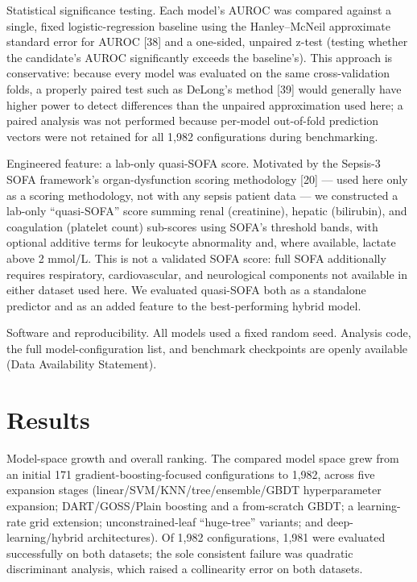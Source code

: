 \documentclass[10pt]{article} %
\begin{document}
Statistical significance testing. Each model's AUROC was compared against a single, fixed logistic-regression baseline using the Hanley--McNeil approximate standard error for AUROC [38] and a one-sided, unpaired z-test (testing whether the candidate's AUROC significantly exceeds the baseline's). This approach is conservative: because every model was evaluated on the same cross-validation folds, a properly paired test such as DeLong's method [39] would generally have higher power to detect differences than the unpaired approximation used here; a paired analysis was not performed because per-model out-of-fold prediction vectors were not retained for all 1,982 configurations during benchmarking.

Engineered feature: a lab-only quasi-SOFA score. Motivated by the Sepsis-3 SOFA framework's organ-dysfunction scoring methodology [20] --- used here only as a scoring methodology, not with any sepsis patient data --- we constructed a lab-only ``quasi-SOFA'' score summing renal (creatinine), hepatic (bilirubin), and coagulation (platelet count) sub-scores using SOFA's threshold bands, with optional additive terms for leukocyte abnormality and, where available, lactate above 2 mmol/L. This is not a validated SOFA score: full SOFA additionally requires respiratory, cardiovascular, and neurological components not available in either dataset used here. We evaluated quasi-SOFA both as a standalone predictor and as an added feature to the best-performing hybrid model.

Software and reproducibility. All models used a fixed random seed. Analysis code, the full model-configuration list, and benchmark checkpoints are openly available (Data Availability Statement).

\section{Results}

Model-space growth and overall ranking. The compared model space grew from an initial 171 gradient-boosting-focused configurations to 1,982, across five expansion stages (linear/SVM/KNN/tree/ensemble/GBDT hyperparameter expansion; DART/GOSS/Plain boosting and a from-scratch GBDT; a learning-rate grid extension; unconstrained-leaf ``huge-tree'' variants; and deep-learning/hybrid architectures). Of 1,982 configurations, 1,981 were evaluated successfully on both datasets; the sole consistent failure was quadratic discriminant analysis, which raised a collinearity error on both datasets.
\end{document}
